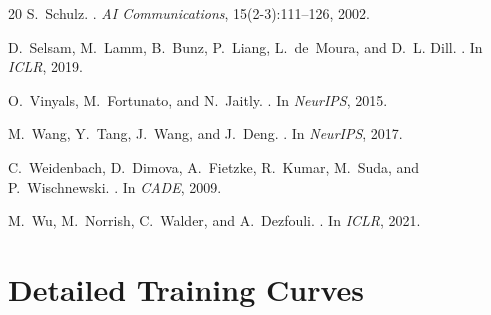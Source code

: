 \documentclass{article}
\begin{document}
\begin{thebibliography}{20}
S.~Schulz.
.
\newblock \emph{AI Communications}, 15(2-3):111--126, 2002.

D.~Selsam, M.~Lamm, B.~Bunz, P.~Liang, L.~de~Moura, and D.~L. Dill.
.
\newblock In \emph{ICLR}, 2019.

O.~Vinyals, M.~Fortunato, and N.~Jaitly.
.
\newblock In \emph{NeurIPS}, 2015.

M.~Wang, Y.~Tang, J.~Wang, and J.~Deng.
.
\newblock In \emph{NeurIPS}, 2017.

C.~Weidenbach, D.~Dimova, A.~Fietzke, R.~Kumar, M.~Suda, and P.~Wischnewski.
.
\newblock In \emph{CADE}, 2009.

M.~Wu, M.~Norrish, C.~Walder, and A.~Dezfouli.
.
\newblock In \emph{ICLR}, 2021.

\end{thebibliography}

\newpage
\appendix

\section{Detailed Training Curves}
\label{app:training}
\end{document}
